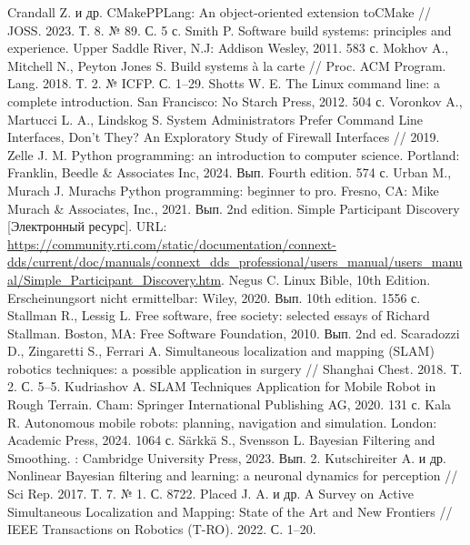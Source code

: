 \documentclass[a4paper, 14pt]{extreport}
\begin{document}
\begin{thebibliography}{9}
            Crandall Z. и др. CMakePPLang: An object-oriented extension toCMake // JOSS. 2023. Т. 8. № 89. С. 5 с.
          Smith P. Software build systems: principles and experience. Upper Saddle River, N.J: Addison Wesley, 2011. 583 с.
         Mokhov A., Mitchell N., Peyton Jones S. Build systems à la carte // Proc. ACM Program. Lang. 2018. Т. 2. № ICFP. С. 1–29.
          Shotts W. E. The Linux command line: a complete introduction. San Francisco: No Starch Press, 2012. 504 с.
          Voronkov A., Martucci L. A., Lindskog S. System Administrators Prefer Command Line Interfaces, Don’t They? An Exploratory Study of Firewall Interfaces // 2019.
         Zelle J. M. Python programming: an introduction to computer science. Portland: Franklin, Beedle \& Associates Inc, 2024. Вып. Fourth edition. 574 с.
          Urban M., Murach J. Murachs Python programming: beginner to pro. Fresno, CA: Mike Murach \& Associates, Inc., 2021. Вып. 2nd edition.
         Simple Participant Discovery [Электронный ресурс]. URL: \url{https://community.rti.com/static/documentation/connext-dds/current/doc/manuals/connext_dds_professional/users_manual/users_manual/Simple_Participant_Discovery.htm}.
          Negus C. Linux Bible, 10th Edition. Erscheinungsort nicht ermittelbar: Wiley, 2020. Вып. 10th edition. 1556 с.
          Stallman R., Lessig L. Free software, free society: selected essays of Richard Stallman. Boston, MA: Free Software Foundation, 2010. Вып. 2nd ed.
          Scaradozzi D., Zingaretti S., Ferrari A. Simultaneous localization and mapping (SLAM) robotics techniques: a possible application in surgery // Shanghai Chest. 2018. Т. 2. С. 5–5.
          Kudriashov A. SLAM Techniques Application for Mobile Robot in Rough Terrain. Cham: Springer International Publishing AG, 2020. 131 с.
           Kala R. Autonomous mobile robots: planning, navigation and simulation. London: Academic Press, 2024. 1064 с.
         Särkkä S., Svensson L. Bayesian Filtering and Smoothing. : Cambridge University Press, 2023. Вып. 2.
          Kutschireiter A. и др. Nonlinear Bayesian filtering and learning: a neuronal dynamics for perception // Sci Rep. 2017. Т. 7. № 1. С. 8722.
          Placed J. A. и др. A Survey on Active Simultaneous Localization and Mapping: State of the Art and New Frontiers // IEEE Transactions on Robotics (T-RO). 2022. С. 1–20.

\end{thebibliography}
\end{document}
